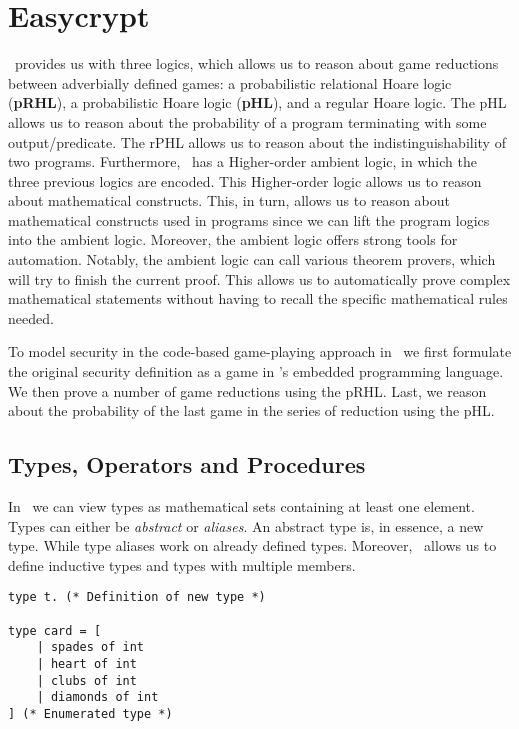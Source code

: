 \section{Easycrypt}
\label{sec:label}
\easycrypt\ provides us with three logics, which allows us to reason about game
reductions between adverbially defined games: a probabilistic relational
Hoare logic (\textbf{pRHL}), a probabilistic Hoare logic (\textbf{pHL}), and a
regular Hoare logic.
The pHL allows us to reason about the probability of a program terminating with
some output/predicate.
The rPHL allows us to reason about the
indistinguishability of two programs.
Furthermore, \easycrypt\ has a Higher-order ambient logic, in which the three
previous logics are encoded.
This Higher-order logic allows us to reason about mathematical constructs. This,
in turn, allows us to reason about mathematical constructs used in programs
since we can lift the program logics into the ambient logic.
Moreover, the ambient logic offers strong tools for automation. Notably, the
ambient logic can call various theorem provers, which will try to finish the
current proof. This allows us to automatically prove complex mathematical
statements without having to recall the specific mathematical rules needed.

To model security in the code-based game-playing approach in \easycrypt\ we
first formulate the original security definition as a game in \easycrypt's embedded
programming language. We then prove a number of game reductions using the pRHL.
Last, we reason about the probability of the last game in the series of
reduction using the pHL.


\subsection{Types, Operators and Procedures}
\label{sec:ec_types_and_operators}
In \easycrypt\ we can view types as mathematical sets containing at least one
element. Types can either be \textit{abstract} or \textit{aliases}. An abstract
type is, in essence, a new type. While type aliases work on already defined
types.
Moreover, \easycrypt\ allows us to define inductive types and types with
multiple members.
\begin{lstlisting}
type t. (* Definition of new type *)

type card = [
    | spades of int
    | heart of int
    | clubs of int
    | diamonds of int
] (* Enumerated type *)
\end{lstlisting}

